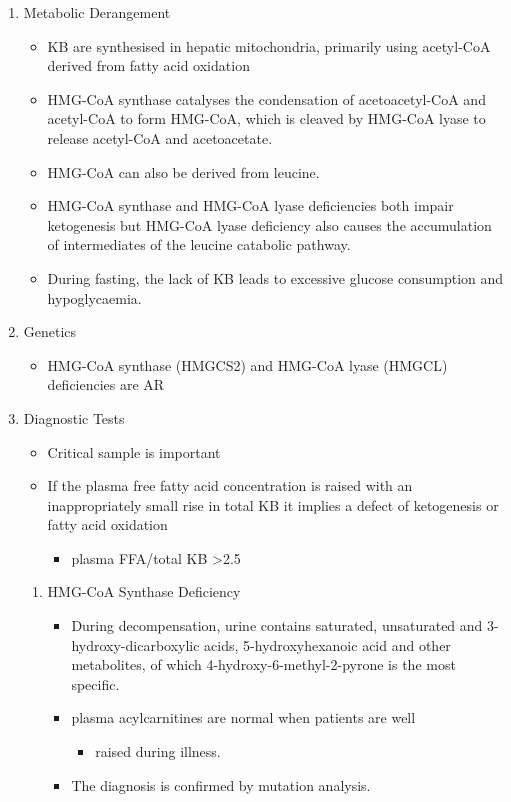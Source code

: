 \documentclass{scrartcl}
\begin{document}
\begin{enumerate}
\item Metabolic Derangement
\label{sec:org453f2fa}
\begin{itemize}
\item KB are synthesised in hepatic mitochondria, primarily using
acetyl-CoA derived from fatty acid oxidation
\item HMG-CoA synthase catalyses the condensation of acetoacetyl-CoA and
acetyl-CoA to form HMG-CoA, which is cleaved by HMG-CoA lyase to
release acetyl-CoA and acetoacetate.
\item HMG-CoA can also be derived from leucine.
\item HMG-CoA synthase and HMG-CoA lyase deficiencies both impair
ketogenesis but HMG-CoA lyase deficiency also causes the
accumulation of intermediates of the leucine catabolic pathway.
\item During fasting, the lack of KB leads to excessive glucose
consumption and hypoglycaemia.
\end{itemize}

\item Genetics
\label{sec:org01c3105}
\begin{itemize}
\item HMG-CoA synthase (HMGCS2) and HMG-CoA lyase (HMGCL) deficiencies are
AR
\end{itemize}

\item Diagnostic Tests
\label{sec:org78e5555}
\begin{itemize}
\item Critical sample is important
\item If the plasma free fatty acid concentration is raised with an
inappropriately small rise in total KB it implies a defect of
ketogenesis or fatty acid oxidation 
\begin{itemize}
\item plasma FFA/total KB >2.5
\end{itemize}
\end{itemize}

\begin{enumerate}
\item HMG-CoA Synthase Deficiency
\label{sec:org058e31e}
\begin{itemize}
\item During decompensation, urine contains saturated, unsaturated and
3-hydroxy-dicarboxylic acids, 5-hydroxyhexanoic acid and other
metabolites, of which 4-hydroxy-6-methyl-2-pyrone is the most
specific.
\item plasma acylcarnitines are normal when patients are well
\begin{itemize}
\item raised during illness.
\end{itemize}
\item The diagnosis is confirmed by mutation analysis.
\end{itemize}


\end{enumerate}
\end{enumerate}
\end{document}
